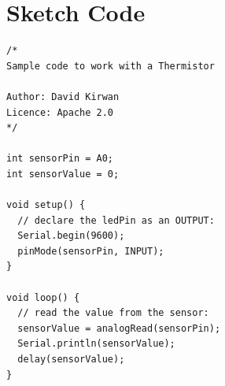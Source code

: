 \newpage
\section*{Sketch Code}
\label{sketch:exp4}
\begin{lstlisting}
/*
Sample code to work with a Thermistor

Author: David Kirwan
Licence: Apache 2.0
*/

int sensorPin = A0;
int sensorValue = 0;

void setup() {
  // declare the ledPin as an OUTPUT:
  Serial.begin(9600);
  pinMode(sensorPin, INPUT);
}

void loop() {
  // read the value from the sensor:
  sensorValue = analogRead(sensorPin);
  Serial.println(sensorValue);
  delay(sensorValue);
}
\end{lstlisting}